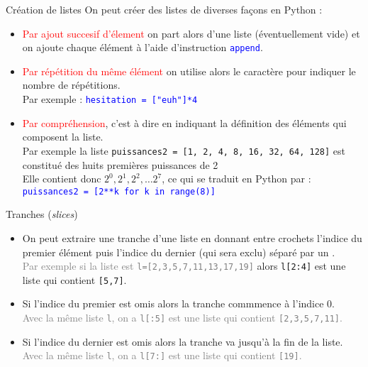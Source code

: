 \documentclass[10pt]{beamer}
\begin{document}
\begin{frame}[fragile]{\Ctitle}{\stitle}
	\begin{alertblock}{Création de listes}
		On peut créer des listes de diverses façons en Python :
		\begin{itemize}
			\item<2-> \textcolor{red}{Par ajout succesif d'élement} on part alors d'une liste (éventuellement vide) et on ajoute chaque élément à l'aide d'instruction \textcolor{blue}{\tt append}.
			\item<3-> \textcolor{red}{Par répétition du même élément} on utilise alors le caractère \textcolor{blue}{\tt *} pour indiquer le nombre de répétitions. \\
				\onslide<4-> {Par exemple : \textcolor{blue}{\tt hesitation = ["euh"]*4}}
			\item<6->	 \textcolor{red}{Par compréhension}, c'est à dire en indiquant la définition des éléments qui composent la liste. \\
				\onslide<7-> {Par exemple la liste {\tt puissances2 = [1, 2, 4, 8, 16, 32, 64, 128]} est constitué des huits premières puissances de 2} \\
				\onslide<8-> {Elle contient donc $2^0, 2^1, 2^2, \dots 2^7$, ce qui se traduit en Python par :}\\
				\onslide<9-> \textcolor{blue}{\tt puissances2 = [2**k for k in range(8)]}
		\end{itemize}
	\end{alertblock}
\end{frame}

\begin{frame}[fragile]{\Ctitle}{\stitle}
	\begin{alertblock}{Tranches (\textit{slices})}
		\begin{itemize}
			\item<1->On peut extraire une tranche d'une liste en donnant entre crochets l'indice du premier élément puis l'indice du dernier (qui sera exclu) séparé par un \kw{:}.\\
			\onslide<2->\textcolor{gray}{\small Par exemple si la liste est {\tt l=[2,3,5,7,11,13,17,19]}} alors {\tt l[2:4]} est une liste qui contient {\tt [5,7]}.
			\item<3-> Si l'indice du premier est omis alors la tranche commmence à l'indice 0.\\
				\onslide<4->\textcolor{gray}{\small Avec la même liste {\tt l}, on a {\tt l[:5]} est une liste qui contient {\tt [2,3,5,7,11]}.}
			\item<5-> Si l'indice du dernier est omis alors la tranche va jusqu'à la fin de la liste.\\
				\onslide<6->\textcolor{gray}{\small Avec la même liste {\tt l}, on a {\tt l[7:]} est une liste qui contient {\tt [19]}.}
		\end{itemize}
	\end{alertblock}
\end{frame}
\end{document}
